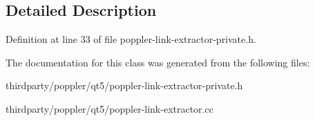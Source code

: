 \subsection{Detailed Description}


Definition at line 33 of file poppler-\/link-\/extractor-\/private.\+h.



The documentation for this class was generated from the following files\+:\begin{DoxyCompactItemize}
\item 
thirdparty/poppler/qt5/poppler-\/link-\/extractor-\/private.\+h\item 
thirdparty/poppler/qt5/poppler-\/link-\/extractor.\+cc\end{DoxyCompactItemize}
